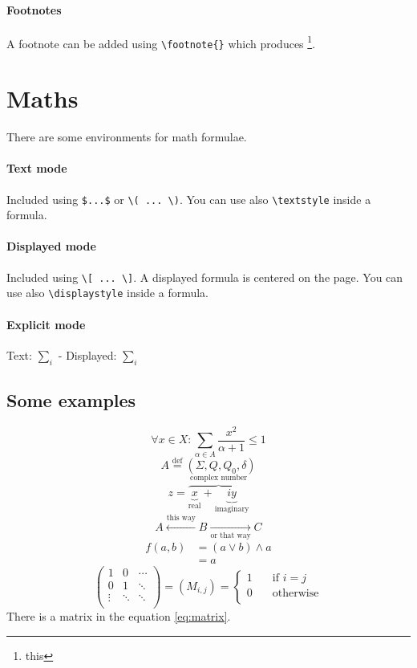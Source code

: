 \paragraph{Footnotes}
A footnote can be added using \lstinline!\footnote{}! which produces%
\footnote{this}.

\section{Maths}

There are some environments for math formulae.

\paragraph{Text mode}
Included using \lstinline!$...$! or \lstinline$\( ... \)$.
You can use also \lstinline$\textstyle$ inside a formula.

\paragraph{Displayed mode}
Included using \lstinline$\[ ... \]$.
A displayed formula is centered on the page.
You can use also \lstinline$\displaystyle$ inside a formula.

\paragraph{Explicit mode}
Text: $\textstyle \sum_i$ - Displayed: $\displaystyle \sum_i$

\subsection*{Some examples}
\[ \forall x \in X: \sum_{\alpha \in A} \frac{x^2}{\alpha + 1} \leq 1 \]
\[ A \overset{\textrm{def}}{=} (\Sigma, Q, Q_0, \delta) \]
\[ z = \overbrace{
	\underbrace{x}_\text{real} +
	\underbrace{iy}_\text{imaginary}
	}^\text{complex number}
\]
\[ A \xleftarrow{\text{this way}} B
	\xrightarrow[\text{or that way}]{} C \]
\begin{align*}
f(a, b)
	&= (a \vee b) \wedge a \\
	&= a
\end{align*}
\begin{equation}
\label{eq:matrix}
\begin{pmatrix}
1 & 0 & \cdots \\
0 & 1 & \ddots \\
\vdots & \ddots & \ddots \\
\end{pmatrix}
= (M_{i,j}) = \left\lbrace\begin{array}{cl}
1 & \quad \text{if $i = j$} \\
0 & \quad \text{otherwise} \\
\end{array}\right.
\end{equation}
There is a matrix in the equation \eqref{eq:matrix}.

